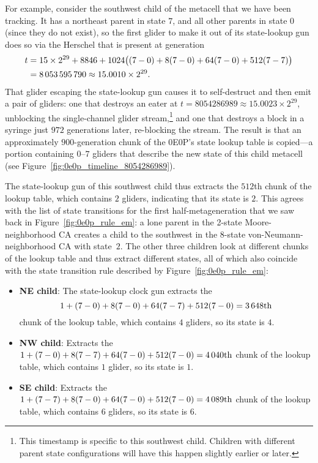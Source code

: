 For example, consider the southwest child of the metacell that we have been tracking. It has a northeast parent in state $7$, and all other parents in state $0$ (since they do not exist), so the first glider to make it out of its state-lookup gun does so via the Herschel that is present at generation
\begin{align*}
	t & = 15 \times 2^{29} + 8846 + 1024\big((7-0) + 8(7-0) + 64(7-0) + 512(7-7)\big) \\
	& = 8{\,}053{\,}595{\,}790 \approx 15.0010 \times 2^{29}.
\end{align*}
That glider escaping the state-lookup gun causes it to self-destruct and then emit a pair of gliders: one that destroys an eater at $t = 8054286989 \approx 15.0023 \times 2^{29}$, unblocking the single-channel glider stream,\footnote{This timestamp is specific to this southwest child. Children with different parent state configurations will have this happen slightly earlier or later.} and one that destroys a block in a syringe just $972$ generations later, re-blocking the stream. The result is that an approximately $900$-generation chunk of the 0E0P's state lookup table is copied---a portion containing $0$--$7$ gliders that describe the new state of this child metacell (see Figure~\ref{fig:0e0p_timeline_8054286989}).

The state-lookup gun of this southwest child thus extracts the $512$th chunk of the lookup table, which contains $2$ gliders, indicating that its state is $2$. This agrees with the list of state transitions for the first half-metageneration that we saw back in Figure~\ref{fig:0e0p_rule_em}: a lone parent in the 2-state Moore-neighborhood CA creates a child to the southwest in the 8-state von-Neumann-neighborhood CA with state~$2$. The other three children look at different chunks of the lookup table and thus extract different states, all of which also coincide with the state transition rule described by Figure~\ref{fig:0e0p_rule_em}:\smallskip

\begin{itemize}
	\item \textbf{NE child}: The state-lookup clock gun extracts the
	\[
		1 + (7-0) + 8(7-0) + 64(7-7) + 512(7-0) = 3{\,}648\text{th}
	\]
	chunk of the lookup table, which contains $4$ gliders, so its state is $4$.\smallskip
	
	\item \textbf{NW child}: Extracts the $1 + (7-0) + 8(7-7) + 64(7-0) + 512(7-0) = 4{\,}040\text{th}$ chunk of the lookup table, which contains $1$ glider, so its state is $1$.\smallskip
	
	\item \textbf{SE child}: Extracts the $1 + (7-7) + 8(7-0) + 64(7-0) + 512(7-0) = 4{\,}089\text{th}$ chunk of the lookup table, which contains $6$ gliders, so its state is $6$.\smallskip
\end{itemize}

